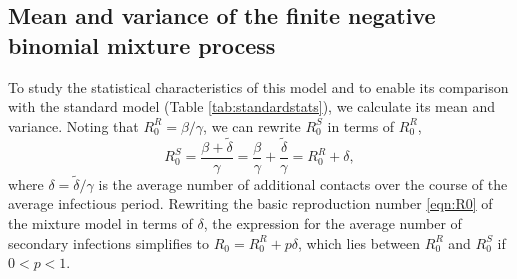\documentclass{imammb}
\numberwithin{equation}{section}
\begin{document}


\subsection{Mean and variance of the finite  negative binomial mixture process} %
To study the statistical characteristics of this model and to enable its comparison with the standard model (Table \ref{tab:standardstats}), we calculate its mean and variance.  Noting that $R_0^R = \beta/\gamma$,  we can rewrite $R_0^S$ in terms of $R_0^R$,
\begin{equation}
R_0^S = \frac{\beta + \tilde{\delta}}{\gamma} = \frac{\beta}{\gamma} + \frac{ \tilde{\delta}}{\gamma} = R_0^R + \delta, 
\end{equation}
where $\delta =\tilde{\delta}/\gamma$ is the average number of additional contacts over the course of the average infectious period.  Rewriting the basic reproduction number \eqref{eqn:R0} of the mixture model  in terms of $\delta$, the expression for the average number of secondary infections simplifies to $R_0 = R_0^R + p \delta$, which lies between $R_0^R$ and $R_0^S$ if $0<p<1$. 
\end{document}
